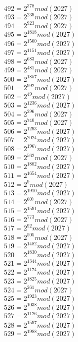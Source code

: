 \documentclass[12pt, letterpaper]{article}
\begin{document}
\begin{itemize}
\begin{multicols}{3}
$492= 2^{378} mod (2027)$\\
$493= 2^{239} mod (2027)$\\
$494= 2^{923} mod (2027)$\\
$495= 2^{1818} mod (2027)$\\
$496= 2^{1500} mod (2027)$\\
$497= 2^{1151} mod (2027)$\\
$498= 2^{683} mod (2027)$\\
$499= 2^{481} mod (2027)$\\
$500= 2^{1857} mod (2027)$\\
$501= 2^{992} mod (2027)$\\
$502= 2^{49} mod (2027)$\\
$503= 2^{1236} mod (2027)$\\
$504= 2^{296} mod (2027)$\\
$505= 2^{740} mod (2027)$\\
$506= 2^{1293} mod (2027)$\\
$507= 2^{2024} mod (2027)$\\
$508= 2^{1967} mod (2027)$\\
$509= 2^{562} mod (2027)$\\
$510= 2^{1882} mod (2027)$\\
$511= 2^{1654} mod (2027)$\\
$512= 2^{9} mod (2027)$\\
$513= 2^{1910} mod (2027)$\\
$514= 2^{607} mod (2027)$\\
$515= 2^{1591} mod (2027)$\\
$516= 2^{773} mod (2027)$\\
$517= 2^{92} mod (2027)$\\
$518= 2^{505} mod (2027)$\\
$519= 2^{1482} mod (2027)$\\
$520= 2^{1830} mod (2027)$\\
$521= 2^{1344} mod (2027)$\\
$522= 2^{1174} mod (2027)$\\
$523= 2^{1825} mod (2027)$\\
$524= 2^{261} mod (2027)$\\
$525= 2^{1923} mod (2027)$\\
$526= 2^{1038} mod (2027)$\\
$527= 2^{1126} mod (2027)$\\
$528= 2^{1597} mod (2027)$\\
$529= 2^{1988} mod (2027)$\\

\end{multicols}
\end{itemize}
\end{document}
